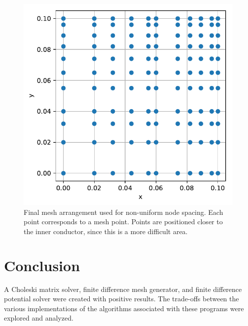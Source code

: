 \documentclass[a4paper,titlepage]{article}
\begin{document}
	\begin{figure}[!htb]
		\centering
		\includegraphics[width=\columnwidth]{plots/q3e.pdf}
		\caption
		{Final mesh arrangement used for non-uniform node spacing. Each point corresponds to a mesh point. Points are positioned closer to the inner conductor, since this is a more difficult area.}
		\label{fig:q3e}
	\end{figure}

	\section*{Conclusion}
	
	A Choleski matrix solver, finite difference mesh generator, and finite difference potential solver were created with positive results. The trade-offs between the various implementations of the algorithms associated with these programs were explored and analyzed.
	
	\onecolumn
	
	
\end{document}
